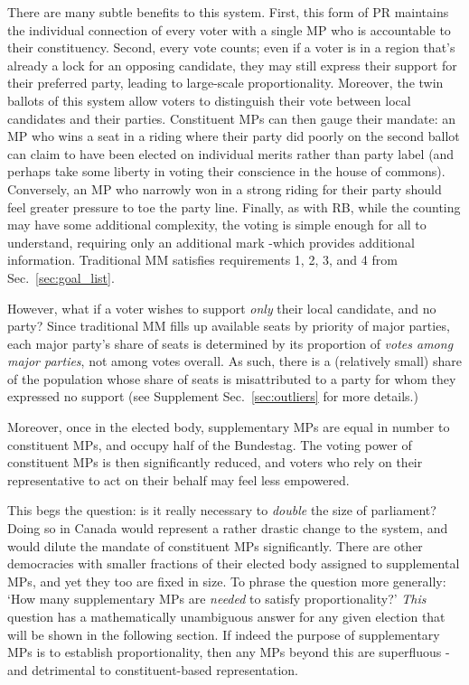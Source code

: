 There are many subtle benefits to this system. 
First, this form of PR maintains the individual connection of every voter with a single MP who is accountable to their constituency.
Second, every vote counts; even if a voter is in a region that's already a lock for an opposing candidate, they may still express their support for their preferred party, leading to large-scale proportionality.
Moreover, the twin ballots of this system allow voters to distinguish their vote between local candidates and their parties.  Constituent MPs can then gauge their mandate: an MP who wins a seat in a riding where their party did poorly on the second ballot can claim to have been elected on individual merits rather than party label (and perhaps take some liberty in voting their conscience in the house of commons). Conversely, an MP who narrowly won in a strong riding for their party should feel greater pressure to toe the party line.
Finally, as with RB, while the counting may have some additional complexity, the voting is simple enough for all to understand, requiring only an additional mark \--which provides additional information. Traditional MM satisfies requirements 1, 2, 3, and 4 from Sec.~\ref{sec:goal_list}.

However, what if a voter wishes to support \emph{only} their local candidate, and no party? Since traditional MM fills up available seats by priority of major parties, each major party's share of seats is determined by its proportion of \emph{votes among major parties}, not among votes overall. As such, there is a (relatively small) share of the population whose share of seats is misattributed to a party for whom they expressed no support (see Supplement Sec.~\ref{sec:outliers} for more details.)

Moreover, once in the elected body, supplementary MPs are equal in number to constituent MPs, and occupy half of the Bundestag. 
The voting power of constituent MPs is then significantly reduced, and voters who rely on their representative to act on their behalf may feel less empowered.

This begs the question: is it really necessary to \emph{double} the size of parliament? Doing so in Canada would represent a rather drastic change to the system, and would dilute the mandate of constituent MPs significantly. 
There are other democracies with smaller fractions of their elected body assigned to supplemental MPs, and yet they too are fixed in size.
To phrase the question more generally: `How many supplementary MPs are \emph{needed} to satisfy proportionality?' 
\emph{This} question has a mathematically unambiguous answer for any given election that will be shown in the following section. 
If indeed the purpose of supplementary MPs is to establish proportionality, then any MPs beyond this are superfluous \--and detrimental to constituent-based representation.

